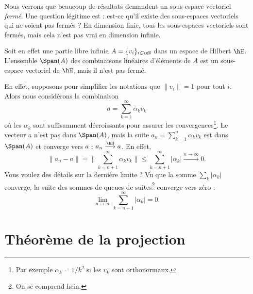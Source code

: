 Nous verrons que beaucoup de résultats demandent un sous-espace vectoriel \emph{fermé}. Une question légitime est : est-ce qu'il existe des sous-espaces vectoriels qui ne soient pas fermés ? En dimension finie, tous les sous-espaces vectoriels sont fermés, mais cela n'est pas vrai en dimension infinie.

Soit en effet une partie libre infinie \( A=\{ v_i \}_{i\in \eN}\) dans un espace de Hilbert \( \hH\). L'ensemble $\Span(A)$ des combinaisons linéaires d'éléments de \( A\) est un sous-espace vectoriel de \( \hH\), mais il n'est pas fermé.

En effet, supposons pour simplifier les notations que \( \| v_i \|=1\) pour tout \( i\). Alors nous considérons la combinaison
\begin{equation}
    a=\sum_{k=1}^{\infty}\alpha_kv_k
\end{equation}
où les \( \alpha_k\) sont suffisamment décroissants pour assurer les convergences\footnote{Par exemple \( \alpha_k=1/k^2\) si les \( v_k\) sont orthonormaux.}. Le vecteur \( a\) n'est pas dans \( \Span(A)\), mais la suite \( a_n=\sum_{k=1}^{n}\alpha_kv_k\) est dans \( \Span(A)\) et converge vers \( a\) : \( a_n\stackrel{\hH}{\longrightarrow}a\). En effet,
\begin{equation}
    \| a_n-a \|=\| \sum_{k=n+1}^{\infty}\alpha_kv_k \|\leq \sum_{k=n+1}^{\infty}| \alpha_k | \stackrel{n\to\infty}{\longrightarrow}0.
\end{equation}
Vous voulez des détails sur la dernière limite ? Vu que la somme \( \sum_k| \alpha_k |\) converge, la suite des sommes de queues de suites\footnote{On se comprend hein.} converge vers zéro :
\begin{equation}
    \lim_{n\to \infty} \sum_{k=n+1}^{\infty}| \alpha_k |=0.
\end{equation}

\section{Théorème de la projection}

